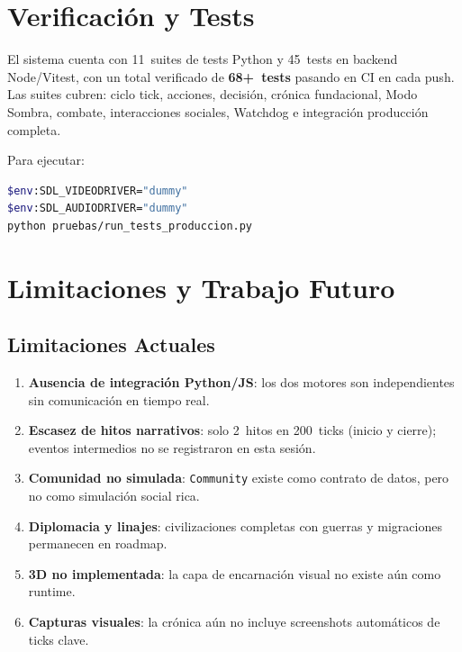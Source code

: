 \documentclass[11pt,a4paper,twocolumn]{article}
\begin{document}
\section{Verificaci\'on y Tests}

El sistema cuenta con 11~suites de tests Python y 45~tests en
backend Node/Vitest, con un total verificado de \textbf{68+~tests}
pasando en CI en cada push.
Las suites cubren: ciclo tick, acciones, decisi\'on, cr\'onica
fundacional, Modo Sombra, combate, interacciones sociales, Watchdog
e integraci\'on producci\'on completa.

Para ejecutar:

\begin{lstlisting}[language=bash, caption={Runner de tests}]
$env:SDL_VIDEODRIVER="dummy"
$env:SDL_AUDIODRIVER="dummy"
python pruebas/run_tests_produccion.py
\end{lstlisting}

\section{Limitaciones y Trabajo Futuro}

\subsection{Limitaciones Actuales}

\begin{enumerate}[leftmargin=1.2em, itemsep=2pt, topsep=2pt]
  \item \textbf{Ausencia de integraci\'on Python/JS}: los dos motores
        son independientes sin comunicaci\'on en tiempo real.
  \item \textbf{Escasez de hitos narrativos}: solo 2~hitos en 200~ticks
        (inicio y cierre); eventos intermedios no se registraron en esta
        sesi\'on.
  \item \textbf{Comunidad no simulada}: \texttt{Community} existe como
        contrato de datos, pero no como simulaci\'on social rica.
  \item \textbf{Diplomacia y linajes}: civilizaciones completas con
        guerras y migraciones permanecen en roadmap.
  \item \textbf{3D no implementada}: la capa de encarnaci\'on visual no
        existe a\'un como runtime.
  \item \textbf{Capturas visuales}: la cr\'onica a\'un no incluye
        screenshots autom\'aticos de ticks clave.
\end{enumerate}
\end{document}
